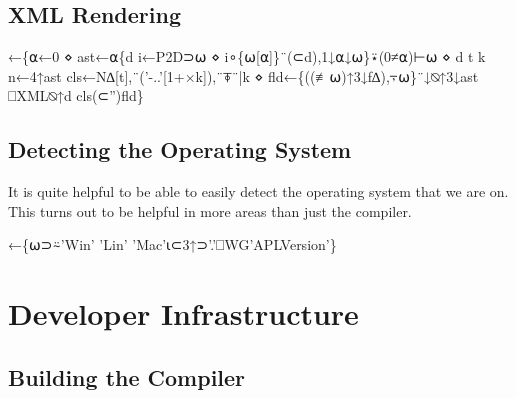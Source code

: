\documentclass{article}%
\begin{document}
\subsection{XML Rendering}

\nwenddocs{}\endmoddef\nwstartdeflinemarkup{}\nwenddeflinemarkup
{}←\{⍺←0 ⋄ ast←⍺\{d i←P2D⊃⍵ ⋄ i∘\{⍵[⍺]\}¨(⊂d),1↓⍺↓⍵\}⍣(0≠⍺)⊢⍵ ⋄ d t k n←4↑ast
        cls←N∆[t],¨('-..'[1+×k]),¨⍕¨|k ⋄ fld←\{((≢⍵)↑3↓f∆),⍪⍵\}¨↓⍉↑3↓ast
        ⎕XML⍉↑d cls(⊂'')fld\}
\eatline
{}\nwendcode{}\nwdocspar
\subsection{Detecting the Operating System}

It is quite helpful to be able to easily detect the operating system
that we are on.
This turns out to be helpful in more areas than just the compiler.

\nwenddocs{}\endmoddef\nwstartdeflinemarkup{}\nwenddeflinemarkup
{}←\{⍵⊃⍨'Win' 'Lin' 'Mac'⍳⊂3↑⊃'.'⎕WG'APLVersion'\}
\eatline
{}\nwendcode{}\nwdocspar
\section{Developer Infrastructure}

\subsection{Building the Compiler}
\end{document}
